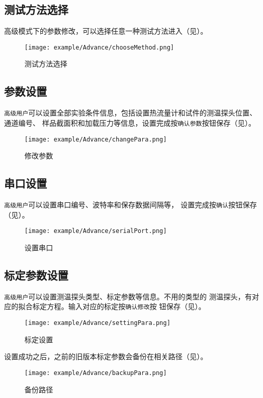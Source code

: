 \subsection{测试方法选择}
高级模式下的参数修改，可以选择任意一种测试方法进入（见）。
\begin{figure}[htbp]
	\centering
	\texttt{[image: example/Advance/chooseMethod.png]}
	\caption{ 测试方法选择\label{fig:advance_chooseMethod}}
\end{figure}

\subsection{参数设置}
\lstinline{高级用户}可以设置全部实验条件信息，包括设置热流量计和试件的测温探头位置、通道编号、
样品截面积和加载压力等信息，设置完成按\lstinline{确认参数}按钮保存（见）。
\begin{figure}[htbp]
	\centering
	\texttt{[image: example/Advance/changePara.png]}
	\caption{ 修改参数 \label{fig:advance_changePara}}
\end{figure}

\subsection{串口设置}
\lstinline{高级用户}可以设置串口编号、波特率和保存数据间隔等，
设置完成按\lstinline{确认}按钮保存（见）。
\begin{figure}[htbp]
	\centering
	\texttt{[image: example/Advance/serialPort.png]}
	\caption{ 设置串口 \label{fig:advance_serialPort}}
\end{figure}

\subsection{标定参数设置}
\lstinline{高级用户}可以设置测温探头类型、标定参数等信息。不用的类型的
测温探头，有对应的拟合标定方程。输入对应的标定按\lstinline{确认修改}按
钮保存（见）。
\begin{figure}[htbp]
	\centering
	\texttt{[image: example/Advance/settingPara.png]}
	\caption{ 标定设置 \label{fig:advance_settingPara}}
\end{figure}
设置成功之后，之前的旧版本标定参数会备份在相关路径（见）。
\begin{figure}[htbp]
	\centering
	\texttt{[image: example/Advance/backupPara.png]}
	\caption{ 备份路径 \label{fig:advance_backupPara}}
\end{figure}






